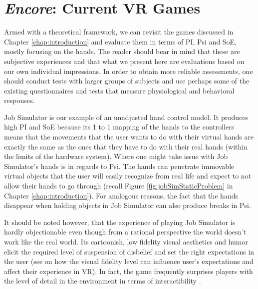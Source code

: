 \section{\textit{Encore}: Current VR Games}
\label{sec:soaRevisited}

Armed with a theoretical framework, we can revisit the games discussed in Chapter \ref{chap:introduction} and evaluate them in terms of PI, Psi and SoE, mostly focusing on the hands. The reader should bear in mind that these are subjective experiences and that what we present here are evaluations based on our own individual impressions. In order to obtain more reliable assessments, one should conduct tests with larger groups of subjects and use perhaps some of the existing questionnaires and tests that measure physiological and behavioral responses.

Job Simulator is our example of an unadjusted hand control model. It produces high PI and SoE because its 1 to 1 mapping of the hands to the controllers means that the movements that the user wants to do with their virtual hands are exactly the same as the ones that they have to do with their real hands (within the limits of the hardware system). Where one might take issue with Job Simulator's hands is in regards to Psi. The hands can penetrate immovable virtual objects that the user will easily recognize from real life and expect to not allow their hands to go through (recall Figure \ref{fig:jobSimStaticProblem} in Chapter \ref{chap:introduction}). For analogous reasons, the fact that the hands disappear when holding objects in Job Simulator can also produce breaks in Psi.


It should be noted however, that the experience of playing Job Simulator is hardly objectionable even though from a rational perspective the world doesn't work like the real world. Its cartoonish, low fidelity visual aesthetics and humor elicit the required level of suspension of disbelief and set the right expectations in the user (see \parencite{Nowak2003, Argelaguet2016} on how the visual fidelity level can influence user's expectations and affect their experience in VR). In fact, the game frequently surprises players with the level of detail in the environment in terms of interactibility \parencite{Schwartz2017}.



